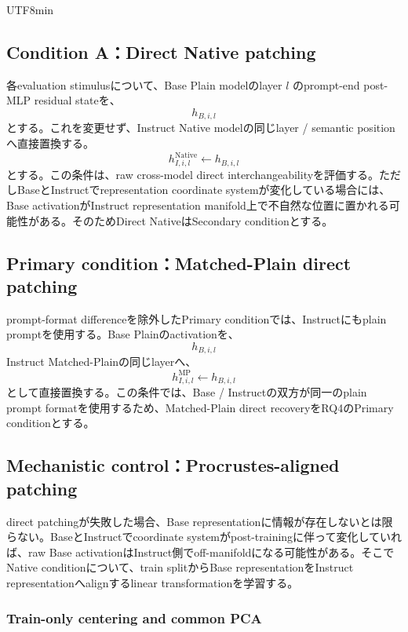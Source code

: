 \documentclass{article} %
\begin{document}
\begin{CJK*}{UTF8}{min}
\subsection{Condition A：Direct Native patching}

各evaluation stimulusについて、Base Plain modelのlayer \(l\) のprompt-end post-MLP residual stateを、
\[
h_{B,i,l}
\]
とする。これを変更せず、Instruct Native modelの同じlayer / semantic positionへ直接置換する。
\[
h_{I,i,l}^{\mathrm{Native}}
\leftarrow
h_{B,i,l}
\]
とする。この条件は、raw cross-model direct interchangeabilityを評価する。ただしBaseとInstructでrepresentation coordinate systemが変化している場合には、Base activationがInstruct representation manifold上で不自然な位置に置かれる可能性がある。そのためDirect NativeはSecondary conditionとする。


\subsection{Primary condition：Matched-Plain direct patching}

prompt-format differenceを除外したPrimary conditionでは、Instructにもplain promptを使用する。Base Plainのactivationを、
\[
h_{B,i,l}
\]
Instruct Matched-Plainの同じlayerへ、
\[
h_{I,i,l}^{\mathrm{MP}}
\leftarrow
h_{B,i,l}
\]
として直接置換する。この条件では、Base / Instructの双方が同一のplain prompt formatを使用するため、Matched-Plain direct recoveryをRQ4のPrimary conditionとする。


\subsection{Mechanistic control：Procrustes-aligned patching}

direct patchingが失敗した場合、Base representationに情報が存在しないとは限らない。BaseとInstructでcoordinate systemがpost-trainingに伴って変化していれば、raw Base activationはInstruct側でoff-manifoldになる可能性がある。そこでNative conditionについて、train splitからBase representationをInstruct representationへalignするlinear transformationを学習する。


\subsubsection{Train-only centering and common PCA}


\end{CJK*}
\end{document}

